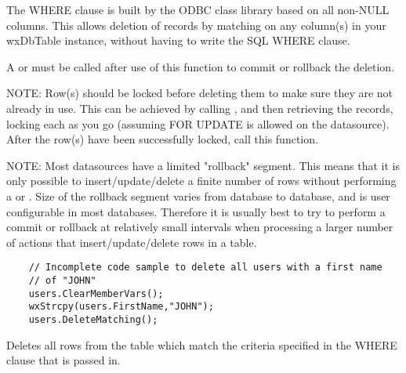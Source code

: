 The WHERE clause is built by the ODBC class library based on all non-NULL
columns.  This allows deletion of records by matching on any column(s) in
your wxDbTable instance, without having to write the SQL WHERE clause.

A  or
 must be called after use of
this function to commit or rollback the deletion.

NOTE: Row(s) should be locked before deleting them to make sure they are
not already in use.  This can be achieved by calling
,
and then retrieving the records, locking each as you go (assuming FOR UPDATE
is allowed on the datasource).  After the row(s) have been successfully locked,
call this function.

NOTE: Most datasources have a limited "rollback" segment.  This means
that it is only possible to insert/update/delete a finite number of rows
without performing a  or
.  Size of the rollback
segment varies from database to database, and is user configurable in
most databases.  Therefore it is usually best to try to perform a commit
or rollback at relatively small intervals when processing a larger number
of actions that insert/update/delete rows in a table.


\begin{verbatim}
    // Incomplete code sample to delete all users with a first name
    // of "JOHN"
    users.ClearMemberVars();
    wxStrcpy(users.FirstName,"JOHN");
    users.DeleteMatching();
\end{verbatim}


\label{wxdbtabledeletewhere}


Deletes all rows from the table which match the criteria specified in the
WHERE clause that is passed in.



